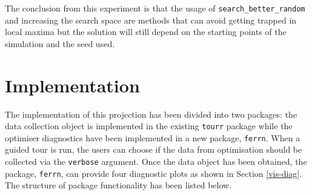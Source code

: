 \documentclass[12pt]{article}
\begin{document}
The conclusion from this experiment is that the usage of \texttt{search\_better\_random} and increasing the search space are methods that can avoid getting trapped in local maxima but the solution will still depend on the starting points of the simulation and the seed used.

\hypertarget{implementation}{%
\section{Implementation}\label{implementation}}

The implementation of this projection has been divided into two packages: the data collection object is implemented in the existing \texttt{tourr} package while the optimiser diagnostics have been implemented in a new package, \texttt{ferrn}. When a guided tour is run, the users can choose if the data from optimisation should be collected via the \texttt{verbose} argument. Once the data object has been obtained, the package, \texttt{ferrn}, can provide four diagnostic plots as shown in Section \ref{vis-diag}. The structure of package functionality has been listed below.
\end{document}
